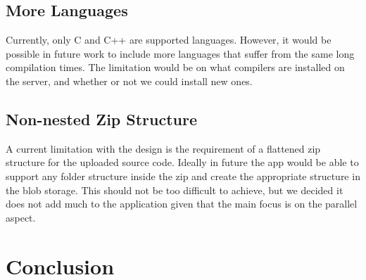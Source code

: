 \documentclass[conference]{IEEEtran}
\begin{document}
\subsection{More Languages}
Currently, only C and C++ are supported languages. However, it would be possible
in future work to include more languages that suffer from the same long
compilation times. The limitation would be on what compilers are installed on
the server, and whether or not we could install new ones.
\subsection{Non-nested Zip Structure}
A current limitation with the design is the requirement of a flattened zip
structure for the uploaded source code. Ideally in future the app would be able
to support any folder structure inside the zip and create the appropriate
structure in the blob storage. This should not be too difficult to achieve, but
we decided it does not add much to the application given that the main focus is
on the parallel aspect.
\section{Conclusion}

\end{document}
